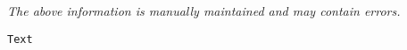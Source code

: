 \label{pkg:text}

{\tiny \it The above information is manually maintained and may contain errors.}
\begin{verbatim}
Text
\end{verbatim}
